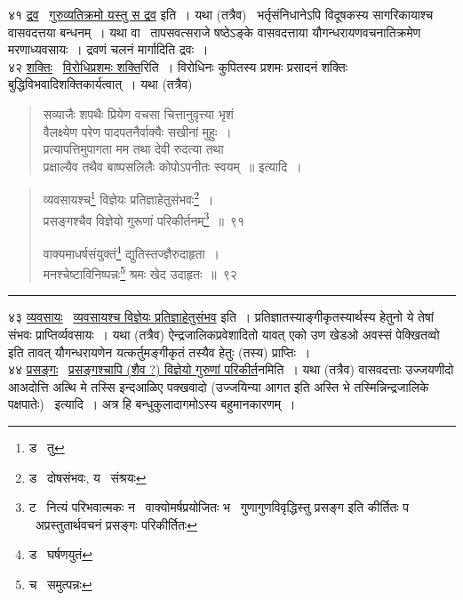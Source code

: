 \documentclass[11pt, openany]{book}
\begin{document}
४१ \underline{द्रव} \textendash\ \underline{गुरुव्यतिक्रमो यस्तु स द्रव} इति~। यथा (तत्रैव) \textendash\ भर्तृसंनिधानेऽपि विदूषकस्य सागरिकायाश्च वासवदत्तया बन्धनम्~। यथा वा \textendash\ तापसवत्सराजे षष्ठेऽङ्के वासवदत्ताया यौगन्धरायणवचनातिक्रमेण मरणाध्यवसायः~। द्रवणं चलनं मार्गादिति द्रवः~।\\

४२ \underline{शक्तिः} \textendash\ \underline{विरोधिप्रशमः शक्ति}रिति~। विरोधिनः कुपितस्य प्रशमः प्रसादनं शक्तिः बुद्धिविभवादिशक्तिकार्यत्वात्~। यथा (तत्रैव) \textendash

\begin{quote}
{\qt सव्याजैः शपथैः प्रियेण वचसा चित्तानुवृत्त्या भृशं\\
वैलक्ष्येण परेण पादपतनैर्वाक्यैः सखीनां मुहुः~।\\
प्रत्यापत्तिमुपागता मम तथा देवी रुदत्या तथा\\
प्रक्षाल्यैव तथैव बाष्पसलिलैः कोपोऽपनीतः स्वयम्~॥} इत्यादि~।
\end{quote}

\newpage

\begin{quote}
{\na व्यवसायश्च\renewcommand{\thefootnote}{1}\footnote{ड \textendash\ तु} विज्ञेयः प्रतिज्ञाहेतुसंभवः\renewcommand{\thefootnote}{2}\footnote{ड \textendash\ दोषसंभवः, य \textendash\ संश्रयः}~।\\
प्रसङ्गश्चैव विज्ञेयो गुरूणां परिकीर्तनम्\renewcommand{\thefootnote}{3}\footnote{ट \textendash\ नित्यं परिभवात्मकः न \textendash\ वाक्योमर्षप्रयोजितः भ \textendash\ गुणागुणविवृद्धिस्तु प्रसङ्ग इति कीर्तितः प \textendash\ अप्रस्तुतार्थवचनं प्रसङ्गः परिकीर्तितः}~॥~९१

वाक्यमाधर्षसंयुक्तं\renewcommand{\thefootnote}{4}\footnote{ड \textendash\ घर्षणयुतं} द्युतिस्तज्ज्ञैरुदाहृता~।\\
मनश्चेष्टाविनिष्पन्नः\renewcommand{\thefootnote}{5}\footnote{च \textendash\ समुत्पन्नः} श्रमः खेद उदाहृतः~॥~९२}
\end{quote}

\hrule

\vspace{2mm}
४३ \underline{व्यवसायः} \textendash\ \underline{व्यवसायश्च विज्ञेयः प्रतिज्ञाहेतुसंभव} इति~। प्रतिज्ञातस्याङ्गीकृतस्यार्थस्य हेतुनो ये तेषां संभवः प्राप्तिर्व्यवसायः~। यथा (तत्रैव) ऐन्द्रजालिकप्रवेशादितो यावत् {\qt एको उण खेडओ अवस्सं पेक्खितव्वो} इति तावत् यौगन्धरायणेन यत्कर्तुमङ्गीकृतं तस्यैव हेतुः (तस्य) प्राप्तिः~।\\

४४ \underline{प्रसङ्गः} \textendash\ \underline{प्रसङ्गश्चापि (शैव ?) विज्ञेयो गुरुणां परिकीर्त}नमिति~। यथा (तत्रैव) वासवदत्ताः उज्जयणीदो आअदोत्ति अत्थि मे तस्सि इन्दआळिए पक्खवादो (उज्जयिन्या आगत इति अस्ति भे तस्मिन्निन्द्रजालिके पक्षपातेः) \textendash\ इत्यादि~। अत्र हि बन्धुकुलादागमोऽस्य बहुमानकारणम्~।\\
\end{document}
